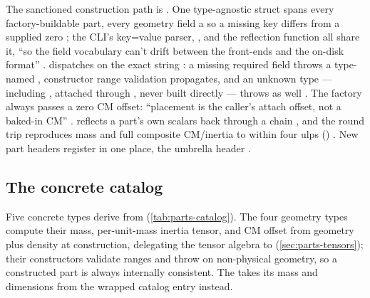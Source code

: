 The sanctioned construction path is . One type-agnostic 
struct spans every factory-buildable part, every geometry field a  so a
missing key differs from a supplied zero ; the CLI's
key=value parser, , and the reflection function  all share
it, ``so the field vocabulary can't drift between the front-ends and the on-disk format''
.  dispatches on the exact
 string : a missing required field
throws a type-named  ,
constructor range validation propagates, and an unknown type --- including ,
attached through , never built directly --- throws as well
. The factory always passes a zero CM offset:
``placement is the caller's attach offset, not a baked-in CM''
.  reflects a part's own scalars back
through a  chain , and the round
trip reproduces mass and full composite CM/inertia to within four ulps
() . New part headers register in one place, the
umbrella header  .

\subsection{The concrete catalog}\label{sec:parts-catalog}

Five concrete types derive from  (\cref{tab:parts-catalog}). The four geometry
types compute their mass, per-unit-mass inertia tensor, and CM offset from geometry plus
density at construction, delegating the tensor algebra to 
(\cref{sec:parts-tensors}); their constructors validate ranges and throw
 on non-physical geometry, so a constructed part is always
internally consistent. The  takes its mass and dimensions from the wrapped
catalog entry instead.

